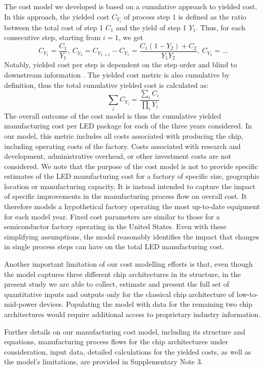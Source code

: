 \documentclass[parskip=full]{article}
\begin{document}
The cost model we developed is based on a cumulative approach to yielded cost\cite{becker2001use}. In this approach, the yielded cost $C_{Y_i}$ of process step $1$ is defined as the ratio between the total cost of step 1 $C_1$ and the yield of step 1 $Y_1$. Thus, for each consecutive step, starting from $i=1$, we get
%
\begin{equation}
    C_{Y_1} = \frac{C_1}{Y_1}, \ C_{Y_2} = C_{Y_{2 \rightarrow 3}} - C_{Y_1} = \frac{C_1(1-Y_2)+C_2}{Y_1Y_2}, \ C_{Y_3}=\dots
\end{equation}
%
Notably, yielded cost per step is dependent on the step order and blind to downstream information \cite{becker2001use}. The yielded cost metric is also cumulative by definition, thus the total cumulative yielded cost is calculated as:
%
\begin{equation}
    \sum_i C_{Y_i} = \frac{\sum_i C_i}{\prod_i Y_i}
\end{equation}
%
The overall outcome of the cost model is thus the cumulative yielded manufacturing cost per LED package for each of the three years considered. In our model, this metric includes all costs associated with producing the chip, including operating costs of the factory. Costs associated with research and development, administrative overhead, or other investment costs are not considered. We note that the purpose of the cost model is not to provide specific estimates of the LED manufacturing cost for a factory of specific size, geographic location or manufacturing capacity. It is instead intended to capture the impact of specific improvements in the manufacturing process flow on overall cost. It therefore models a hypothetical factory operating the most up-to-date equipment for each model year. Fixed cost parameters are similar to those for a semiconductor factory operating in the United States. Even with these simplifying assumptions, the model reasonably identifies the impact that changes in single process steps can have on the total LED manufacturing cost.

Another important limitation of our cost modelling efforts is that, even though the model captures three different chip architectures in its structure, in the present study we are able to collect, estimate and present the full set of quantitative inputs and outputs only for the classical chip architecture of low-to-mid-power devices. Populating the model with data for the remaining two chip architectures would require additional access to proprietary industry information.

Further details on our manufacturing cost model, including its structure and equations, manufacturing process flows for the chip architectures under consideration, input data, detailed calculations for the yielded costs, as well as the model’s limitations, are provided in Supplementary Note 3.
\end{document}
